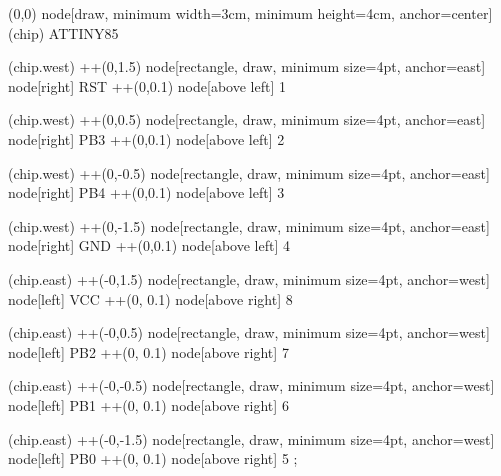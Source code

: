     (0,0) node[draw, minimum width=3cm, minimum height=4cm, anchor=center] (chip) {ATTINY85}

    (chip.west)  ++(0,1.5)
    node[rectangle, draw,   minimum size=4pt, anchor=east] {}
    node[right] {RST} 
    ++(0,0.1)
    node[above left] {1} 


 

    (chip.west) ++(0,0.5) 
    node[rectangle, draw,   minimum size=4pt, anchor=east] {}  
    node[right] {PB3} 
    ++(0,0.1)
    node[above left] {2}  
     
    (chip.west)   ++(0,-0.5) 
    node[rectangle, draw,   minimum size=4pt, anchor=east] {}
    node[right] {PB4} 
    ++(0,0.1)
    node[above left] {3} 

    
    (chip.west) ++(0,-1.5) 
    node[rectangle, draw,   minimum size=4pt, anchor=east] {} %
    node[right] {GND} 
    ++(0,0.1)
    node[above left] {4} 
 



    (chip.east)  ++(-0,1.5) 
    node[rectangle, draw,   minimum size=4pt, anchor=west] {} %
    node[left] {VCC}
    ++(0, 0.1)
    node[above right] {8} 
      
   
    
    (chip.east) ++(-0,0.5)
    node[rectangle, draw,   minimum size=4pt, anchor=west] {}  
    node[left] {PB2}
    ++(0, 0.1)
    node[above right] {7} 

 
    
    (chip.east)   ++(-0,-0.5) 
    node[rectangle, draw,   minimum size=4pt, anchor=west] {} 
    node[left] {PB1}
    ++(0, 0.1)
    node[above right] {6} 
        
 
    
    (chip.east)  ++(-0,-1.5) 
        node[rectangle, draw,   minimum size=4pt, anchor=west] {} 
    node[left] {PB0}
    ++(0, 0.1)
    node[above right] {5} 
        ;
